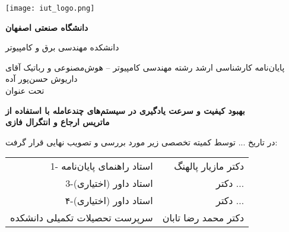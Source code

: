 \thispagestyle{empty}
\begin{center}
\texttt{[image: iut\_logo.png]}
\vspace{0.4cm}

\textbf{دانشگاه صنعتی اصفهان}\\
\vspace{0.4cm}

{\large
	دانشکده مهندسی برق و کامپیوتر
}
\vspace{1.8cm}

\vfill

{\Large
	پایان‌نامه کارشناسی ارشد رشته مهندسی کامپیوتر -- هوش‌مصنوعی و رباتیک آقای داریوش حسن‌پور آده\\
	\vspace{.3cm}
	تحت عنوان\\
}


\end{center}
\vfill
\vspace{2.5cm}

\begin{center}
{\large
	\textbf{بهبود کیفیت و سرعت یادگیری در سیستم‌های چندعامله با استفاده از\\
	\vspace{1em}
	ماتریس ارجاع و انتگرال فازی}
}
\end{center} 

\vspace*{2cm}

در تاریخ ... توسط کمیته تخصصی زیر مورد بررسی و تصویب نهایی قرار گرفت:\\
\vspace{0.8cm}

{\normalsize
	
	\begin{tabular}{rr}
	\vspace*{.8cm}
	1- استاد راهنمای پایان‌نامه  & \hspace{2cm} دکتر مازیار پالهنگ \\
	\vspace{.8cm}
	3-استاد داور (اختیاری) &\hspace{2cm} دکتر ... \\
	\vspace{.8cm}
	۴-استاد داور (اختیاری) &\hspace{2cm} دکتر ... \\
	\vspace{.8cm}
	سرپرست تحصیلات تکمیلی دانشکده &\hspace{2cm} دکتر محمد رضا تابان \\
	\end{tabular}
}
\restoregeometry
\pagebreak

